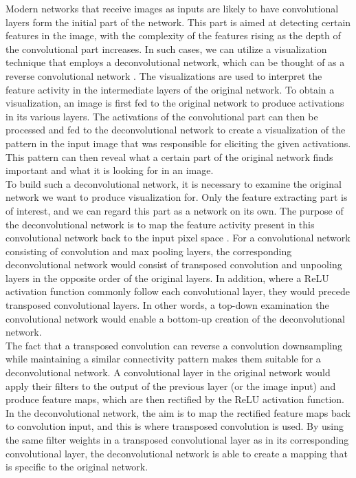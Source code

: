 Modern networks that receive images as inputs are likely to have convolutional layers form the initial part of the network. This part is aimed at detecting certain features in the image, with the complexity of the features rising as the depth of the convolutional part increases. In such cases, we can utilize a visualization technique that employs a deconvolutional network, which can be thought of as a reverse convolutional network \cite{deconv_net}. The visualizations are used to interpret the feature activity in the intermediate layers of the original network. To obtain a visualization, an image is first fed to the original network to produce activations in its various layers. The activations of the convolutional part can then be processed and fed to the deconvolutional network to create a visualization of the pattern in the input image that was responsible for eliciting the given activations. This pattern can then reveal what a certain part of the original network finds important and what it is looking for in an image. \\

\noindent To build such a deconvolutional network, it is necessary to examine the original network we want to produce visualization for. Only the feature extracting part is of interest, and we can regard this part as a network on its own. The purpose of the deconvolutional network is to map the feature activity present in this convolutional network back to the input pixel space \cite{deconv_vis}. For a convolutional network consisting of convolution and max pooling layers, the corresponding deconvolutional network would consist of transposed convolution and unpooling layers in the opposite order of the original layers. In addition, where a ReLU activation function commonly follow each convolutional layer, they would precede transposed convolutional layers. In other words, a top-down examination the convolutional network would enable a bottom-up creation of the deconvolutional network. \\

\noindent The fact that a transposed convolution can reverse a convolution downsampling while maintaining a similar connectivity pattern makes them suitable for a deconvolutional network. A convolutional layer in the original network would apply their filters to the output of the previous layer (or the image input) and produce feature maps, which are then rectified by the ReLU activation function. In the deconvolutional network, the aim is to map the rectified feature maps back to convolution input, and this is where transposed convolution is used. By using the same filter weights in a transposed convolutional layer as in its corresponding convolutional layer, the deconvolutional network is able to create a mapping that is specific to the original network. \\

